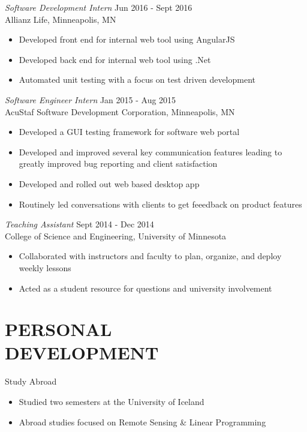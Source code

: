 \documentclass[margin]{res}
\begin{document}
\begin{resume}
                {\sl Software Development Intern} \hfill Jun 2016 - Sept 2016 \\
                Allianz Life,
                Minneapolis, MN
                \begin{itemize}  \itemsep -2pt %
                \item Developed front end for internal web tool using AngularJS
                \item Developed back end for internal web tool using .Net
                \item Automated unit testing with a focus on test driven development
                \end{itemize}

                {\sl Software Engineer Intern} \hfill Jan 2015 - Aug 2015 \\
                AcuStaf Software Development Corporation,
                Minneapolis, MN
                \begin{itemize}  \itemsep -2pt %
                 \item Developed a GUI testing framework for software web portal
                \item  Developed and improved several key communication features
                    leading to greatly improved bug reporting and client satisfaction
                \item  Developed and rolled out web based desktop app
                \item Routinely led conversations with clients to get feeedback on product features
                \end{itemize}

                {\sl Teaching Assistant} \hfill Sept 2014 - Dec 2014 \\
                College of Science and Engineering, University of Minnesota
                \begin{itemize}   %
                \item Collaborated with instructors and faculty to plan, organize, and deploy weekly lessons
                \item Acted as a student resource for questions and university involvement
                \end{itemize}

\section{PERSONAL \\ DEVELOPMENT}
                Study Abroad
                \begin{itemize} \itemsep -2pt
                \item Studied two semesters at the University of Iceland
                \item Abroad studies focused on Remote Sensing \& Linear Programming
                \end{itemize}


\end{resume}
\end{document}
